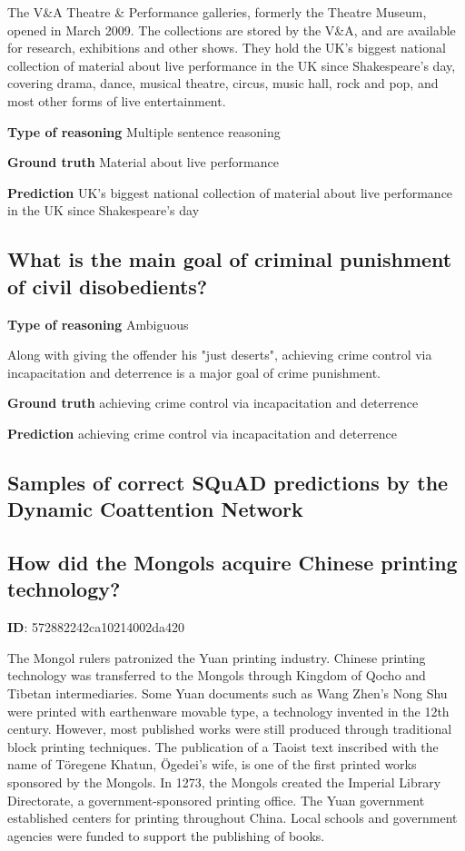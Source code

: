 \documentclass{article} \usepackage{iclr2017_conference,times}
\newcommand{\oursfull}{Dynamic Coattention Network\xspace}
\begin{document}
The V\&A Theatre \& Performance galleries, formerly the Theatre Museum, opened in March 2009. The collections are stored by the V\&A, and are available for research, exhibitions and other shows. They hold the UK's biggest national collection of material about live performance in the UK since Shakespeare's day, covering drama, dance, musical theatre, circus, music hall, rock and pop, and most other forms of live entertainment.

\textbf{Type of reasoning}
Multiple sentence reasoning


\textbf{Ground truth}
Material about live performance

\textbf{Prediction}
UK's biggest national collection of material about live performance in the UK since Shakespeare's day


\subsection*{What is the main goal of criminal punishment of civil disobedients?}

\textbf{Type of reasoning}
Ambiguous

Along with giving the offender his "just deserts", achieving crime control via incapacitation and deterrence is a major goal of crime punishment.

\textbf{Ground truth}
achieving crime control via incapacitation and deterrence

\textbf{Prediction}
achieving crime control via incapacitation and deterrence



\subsection{Samples of \textbf{correct} SQuAD predictions by the \oursfull}

\subsection*{How did the Mongols acquire Chinese printing technology?}

\textbf{ID}: 572882242ca10214002da420

The Mongol rulers patronized the Yuan printing industry. Chinese printing technology was transferred to the Mongols through Kingdom of Qocho and Tibetan intermediaries. Some Yuan documents such as Wang Zhen's Nong Shu were printed with earthenware movable type, a technology invented in the 12th century. However, most published works were still produced through traditional block printing techniques. The publication of a Taoist text inscribed with the name of Töregene Khatun, Ögedei's wife, is one of the first printed works sponsored by the Mongols. In 1273, the Mongols created the Imperial Library Directorate, a government-sponsored printing office. The Yuan government established centers for printing throughout China. Local schools and government agencies were funded to support the publishing of books.
\end{document}
